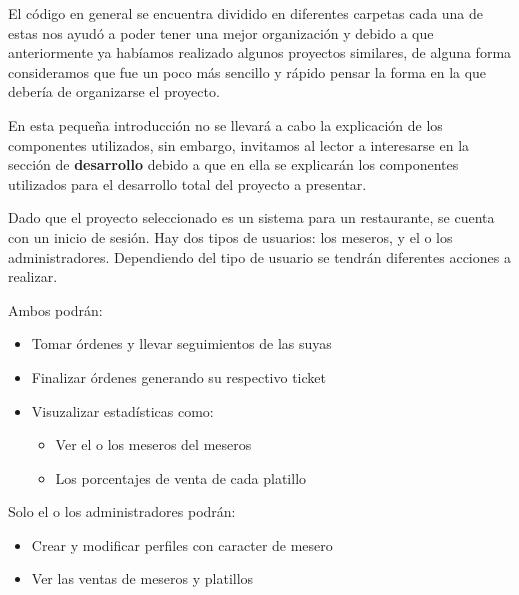 El código en general se encuentra dividido en diferentes carpetas cada una de estas nos ayudó a poder 
tener una mejor organización y debido a que anteriormente ya habíamos realizado algunos proyectos similares, de alguna 
forma consideramos que fue un poco más sencillo y rápido pensar la forma en la que debería de organizarse el 
proyecto. 

En esta pequeña introducción no se llevará a cabo la explicación de los componentes utilizados, sin embargo,
invitamos al lector a interesarse en la sección de \textbf{desarrollo} debido a que en ella se explicarán 
los componentes utilizados para el desarrollo total del proyecto a presentar. 

Dado que el proyecto seleccionado es un sistema para un restaurante, se cuenta con un inicio de sesión. Hay dos tipos de usuarios:
los meseros, y el o los administradores. Dependiendo del tipo de usuario se tendrán diferentes acciones a realizar.

Ambos podrán:

\begin{itemize}
    \item Tomar órdenes y llevar seguimientos de las suyas
    \item Finalizar órdenes generando su respectivo ticket
    \item Visuzalizar estadísticas como:
    \begin{itemize}
        \item Ver el o los meseros del meseros
        \item Los porcentajes de venta de cada platillo
    \end{itemize}
\end{itemize}

Solo el o los administradores podrán:

\begin{itemize}
    \item Crear y modificar perfiles con caracter de mesero
    \item Ver las ventas de meseros y platillos
\end{itemize}


\pagebreak
